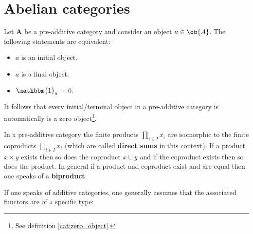 \section{Abelian categories}


    \begin{property}
        Let $\mathbf{A}$ be a pre-additive category and consider an object $a\in\ob{A}$. The following statements are equivalent:
        \begin{itemize}
            \item $a$ is an initial object.
            \item $a$ is a final object.
            \item $\mathbbm{1}_a$ = 0.
        \end{itemize}
        It follows that every initial/terminal object in a pre-additive category is automatically is a zero object\footnote{See definition \ref{cat:zero_object}.}.
    \end{property}
    \begin{property}
        In a pre-additive category the finite products $\prod_{i\in I}x_i$ are isomorphic to the finite coproducts $\bigsqcup_{i\in I} x_i$ (which are called \textbf{direct sums} in this context). If a product $x\times y$ exists then so does the coproduct $x\sqcup y$ and if the coproduct exists then so does the product. In general if a product and coproduct exist and are equal then one speaks of a \textbf{biproduct}.
    \end{property}


    If one speaks of additive categories, one generally assumes that the associated functors are of a specific type:

